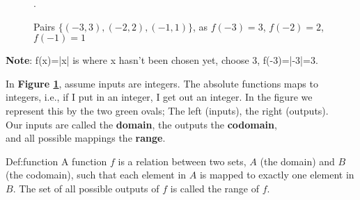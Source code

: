 \begin{figure}[ht]
    \centering
    \caption{\centering Pairs $\{(-3,3),(-2,2),(-1,1)\}$, as $f(-3)=3$, $f(-2)=2$, $f(-1)=1$}.
    \label{fig:relates}
\end{figure}

\begin{Note}
    \textbf{Note}: f(x)=|x| is where x hasn't been chosen yet, choose 3, f(-3)=|-3|=3.
\end{Note}

\noindent
In \textbf{Figure \ref{fig:relates}}, assume inputs are integers. The absolute functions maps to \\
integers, i.e., if I put in an integer, I get out an integer. In the figure we\\
represent this by the two green ovals; The left (inputs), the right (outputs).\\

\noindent
Our inputs are called the \textbf{domain}, the outputs the \textbf{codomain},\\
and all possible mappings the \textbf{range}.\\

\newpage

\begin{Def}[Function]{Def:function}
    A function $f$ is a relation between two sets, $A$ (the domain) and $B$ (the codomain),
    such that each element in $A$ is mapped to exactly one element
    in $B$. The set of all possible outputs of $f$ is called the range of $f$.
\end{Def}

